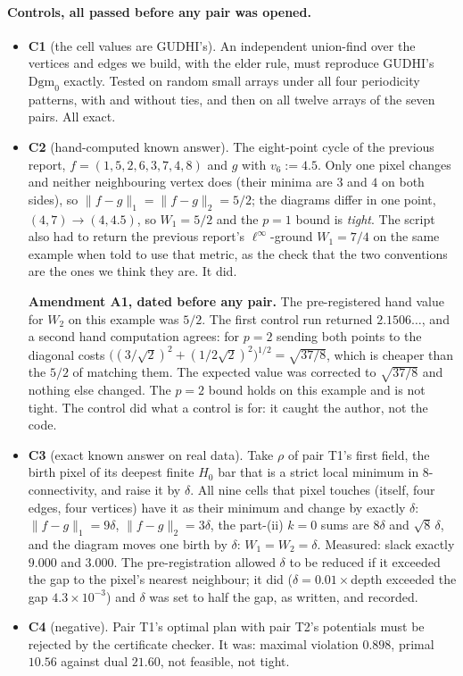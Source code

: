 \documentclass[11pt,a4paper]{article}
\newcommand{\Dgm}{\mathrm{Dgm}}
\begin{document}
\paragraph{Controls, all passed before any pair was opened.}
\begin{itemize}[nosep]
\item \textbf{C1} (the cell values are GUDHI's). An independent union-find over the vertices and edges
we build, with the elder rule, must reproduce GUDHI's $\Dgm_0$ exactly. Tested on random small arrays
under all four periodicity patterns, with and without ties, and then on all twelve arrays of the seven
pairs. All exact.
\item \textbf{C2} (hand-computed known answer). The eight-point cycle of the previous report,
$f=(1,5,2,6,3,7,4,8)$ and $g$ with $v_6:=4.5$. Only one pixel changes and neither neighbouring vertex
does (their minima are $3$ and $4$ on both sides), so $\|f-g\|_1=\|f-g\|_2=5/2$; the diagrams differ in
one point, $(4,7)\to(4,4.5)$, so $W_1=5/2$ and the $p=1$ bound is \emph{tight}. The script also had to
return the previous report's $\ell^\infty$-ground $W_1=7/4$ on the same example when told to use that
metric, as the check that the two conventions are the ones we think they are. It did.
\begin{fixbox}
\textbf{Amendment A1, dated before any pair.} The pre-registered hand value for $W_2$ on this example
was $5/2$. The first control run returned $2.1506\ldots$, and a second hand computation agrees: for
$p=2$ sending both points to the diagonal costs $\big((3/\sqrt2)^2+(1/2\sqrt2)^2\big)^{1/2}
=\sqrt{37/8}$, which is cheaper than the $5/2$ of matching them. The expected value was corrected to
$\sqrt{37/8}$ and nothing else changed. The $p=2$ bound holds on this example and is not tight. The
control did what a control is for: it caught the author, not the code.
\end{fixbox}
\item \textbf{C3} (exact known answer on real data). Take $\rho$ of pair T1's first field, the birth
pixel of its deepest finite $H_0$ bar that is a strict local minimum in $8$-connectivity, and raise it
by $\delta$. All nine cells that pixel touches (itself, four edges, four vertices) have it as their
minimum and change by exactly $\delta$: $\|f-g\|_1=9\delta$, $\|f-g\|_2=3\delta$, the part-(ii) $k=0$
sums are $8\delta$ and $\sqrt8\,\delta$, and the diagram moves one birth by $\delta$: $W_1=W_2=\delta$.
Measured: slack exactly $9.000$ and $3.000$. The pre-registration allowed $\delta$ to be reduced if it
exceeded the gap to the pixel's nearest neighbour; it did ($\delta=0.01\times$depth exceeded the gap
$4.3\times10^{-3}$) and $\delta$ was set to half the gap, as written, and recorded.
\item \textbf{C4} (negative). Pair T1's optimal plan with pair T2's potentials must be rejected by the
certificate checker. It was: maximal violation $0.898$, primal $10.56$ against dual $21.60$, not
feasible, not tight.
\end{itemize}
\end{document}
